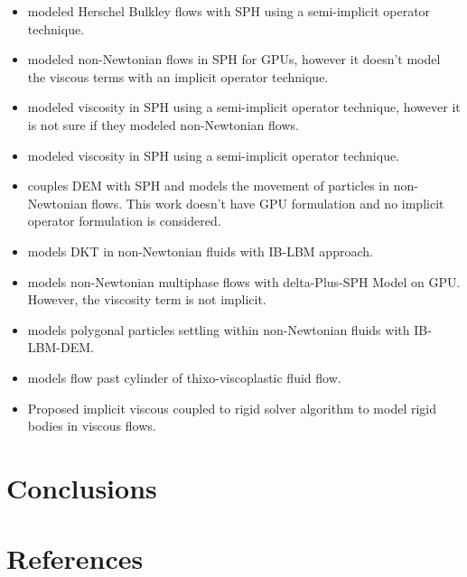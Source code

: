 \documentclass[preprint,12pt]{elsarticle}
\begin{document}
\begin{itemize}
\item \citet{park_semi-implicit_2020} modeled Herschel Bulkley flows with SPH
  using a semi-implicit operator technique.
\item \citet{mao_gpu-accelerated_2022} modeled non-Newtonian flows in SPH for
  GPUs, however it doesn't model the viscous terms with an implicit
  operator technique.
\item \citet{bellaard_simulation_2021} modeled viscosity in SPH using a
  semi-implicit operator technique, however it is not sure if they modeled
  non-Newtonian flows.
\item \citet{han_improved_2013} modeled viscosity in SPH using a semi-implicit
  operator technique.
\item \citet{wu_modelling_2020} couples DEM with SPH and models the movement
  of particles in non-Newtonian flows. This work doesn't have GPU formulation
  and no implicit operator formulation is considered.
\item \citet{hui_drafting_2022} models DKT in non-Newtonian fluids with IB-LBM
  approach.
\item \citep{shi_gpu-based_2022} models non-Newtonian multiphase flows with
  delta-Plus-SPH Model on GPU. However, the viscosity term is not implicit.
\item \citep{jiao_numerical_2022} models polygonal particles settling within
  non-Newtonian fluids with IB-LBM-DEM.
\item \citep{rossi_sph_2022} models flow past cylinder of thixo-viscoplastic
  fluid flow.
\item \citep{dietemann_smoothed_2020} Proposed implicit viscous coupled to
  rigid solver algorithm to model rigid bodies in viscous flows.
\end{itemize}




\FloatBarrier%
\section{Conclusions}
\label{sec:conclusions}


\section*{References}




\end{document}
